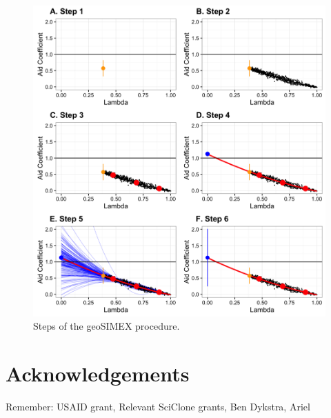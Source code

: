 \documentclass[11pt]{article}
\begin{document}
\begin{figure}[!htbp]
\includegraphics{steps}
\caption{Steps of the geoSIMEX procedure.}\label{fig:steps}
\end{figure}
\newpage

\section{Acknowledgements}
Remember: USAID grant, Relevant SciClone grants, Ben Dykstra, Ariel
\newpage

\printbibliography
\end{document}
